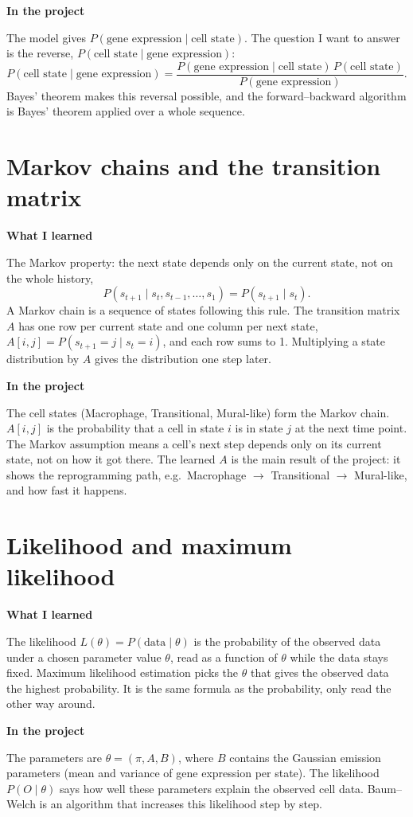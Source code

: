 \documentclass[10pt,a4paper]{article}
\newcommand{\sub}[1]{\vspace{1pt}\textbf{\textcolor{gray!80!black}{#1}}\par}
\begin{document}
\sub{In the project}
The model gives $P(\text{gene expression} \mid \text{cell state})$. The question I want to answer is the reverse, $P(\text{cell state} \mid \text{gene expression})$:
\[
P(\text{cell state} \mid \text{gene expression}) = \frac{P(\text{gene expression} \mid \text{cell state})\,P(\text{cell state})}{P(\text{gene expression})}.
\]
Bayes' theorem makes this reversal possible, and the forward--backward algorithm is Bayes' theorem applied over a whole sequence.

\section{Markov chains and the transition matrix}

\sub{What I learned}
The Markov property: the next state depends only on the current state, not on the whole history,
\[
P(s_{t+1} \mid s_t, s_{t-1}, \dots, s_1) = P(s_{t+1} \mid s_t).
\]
A Markov chain is a sequence of states following this rule. The transition matrix $A$ has one row per current state and one column per next state, $A[i,j] = P(s_{t+1}=j \mid s_t=i)$, and each row sums to 1. Multiplying a state distribution by $A$ gives the distribution one step later.

\sub{In the project}
The cell states (Macrophage, Transitional, Mural-like) form the Markov chain. $A[i,j]$ is the probability that a cell in state $i$ is in state $j$ at the next time point. The Markov assumption means a cell's next step depends only on its current state, not on how it got there. The learned $A$ is the main result of the project: it shows the reprogramming path, e.g.\ Macrophage $\to$ Transitional $\to$ Mural-like, and how fast it happens.

\section{Likelihood and maximum likelihood}

\sub{What I learned}
The likelihood $L(\theta) = P(\text{data} \mid \theta)$ is the probability of the observed data under a chosen parameter value $\theta$, read as a function of $\theta$ while the data stays fixed. Maximum likelihood estimation picks the $\theta$ that gives the observed data the highest probability. It is the same formula as the probability, only read the other way around.

\sub{In the project}
The parameters are $\theta = (\pi, A, B)$, where $B$ contains the Gaussian emission parameters (mean and variance of gene expression per state). The likelihood $P(O \mid \theta)$ says how well these parameters explain the observed cell data. Baum--Welch is an algorithm that increases this likelihood step by step.
\end{document}
